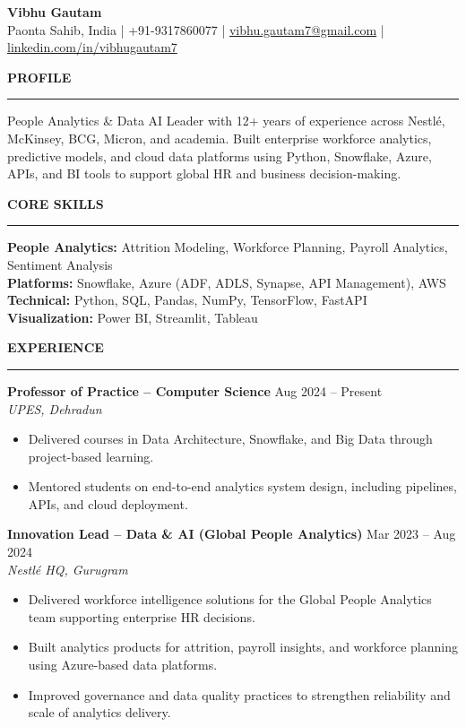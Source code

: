 \documentclass[10.5pt,a4paper]{article}
\newcommand{\sectionline}[1]{
\vspace{0.45em}
{\normalsize \textbf{\MakeUppercase{#1}}}\\[-0.45em]
\rule{\textwidth}{0.5pt}
\vspace{0.15em}
}
\begin{document}
\begin{center}
{\Large \textbf{Vibhu Gautam}}\\
Paonta Sahib, India \;|\; +91-9317860077 \;|\;
\href{mailto:vibhu.gautam7@gmail.com}{vibhu.gautam7@gmail.com} \;|\;
\href{https://www.linkedin.com/in/vibhugautam7}{linkedin.com/in/vibhugautam7}
\end{center}

\vspace{-0.5em}

\sectionline{Profile}
People Analytics \& Data AI Leader with 12+ years of experience across Nestlé, McKinsey, BCG, Micron, and academia. Built enterprise workforce analytics, predictive models, and cloud data platforms using Python, Snowflake, Azure, APIs, and BI tools to support global HR and business decision-making.

\sectionline{Core Skills}
\textbf{People Analytics:} Attrition Modeling, Workforce Planning, Payroll Analytics, Sentiment Analysis \\
\textbf{Platforms:} Snowflake, Azure (ADF, ADLS, Synapse, API Management), AWS \\
\textbf{Technical:} Python, SQL, Pandas, NumPy, TensorFlow, FastAPI \\
\textbf{Visualization:} Power BI, Streamlit, Tableau

\sectionline{Experience}

\textbf{Professor of Practice -- Computer Science} \hfill Aug 2024 -- Present \\
\textit{UPES, Dehradun}
\begin{itemize}
\item Delivered courses in Data Architecture, Snowflake, and Big Data through project-based learning.
\item Mentored students on end-to-end analytics system design, including pipelines, APIs, and cloud deployment.
\end{itemize}

\textbf{Innovation Lead -- Data \& AI (Global People Analytics)} \hfill Mar 2023 -- Aug 2024 \\
\textit{Nestlé HQ, Gurugram}
\begin{itemize}
\item Delivered workforce intelligence solutions for the Global People Analytics team supporting enterprise HR decisions.
\item Built analytics products for attrition, payroll insights, and workforce planning using Azure-based data platforms.
\item Improved governance and data quality practices to strengthen reliability and scale of analytics delivery.
\end{itemize}
\end{document}
